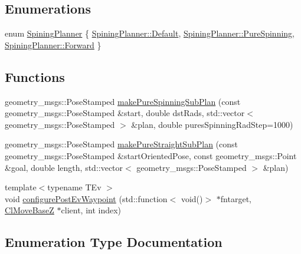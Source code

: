 \subsection*{Enumerations}
\begin{DoxyCompactItemize}
\item 
enum \hyperlink{namespacecl__move__base__z_aab2ad3041275145f0065fb60b3299345}{Spining\+Planner} \{ \hyperlink{namespacecl__move__base__z_aab2ad3041275145f0065fb60b3299345a7a1920d61156abc05a60135aefe8bc67}{Spining\+Planner\+::\+Default}, 
\hyperlink{namespacecl__move__base__z_aab2ad3041275145f0065fb60b3299345aada5274435681a4ce04175bebfa6652f}{Spining\+Planner\+::\+Pure\+Spinning}, 
\hyperlink{namespacecl__move__base__z_aab2ad3041275145f0065fb60b3299345a67d2f6740a8eaebf4d5c6f79be8da481}{Spining\+Planner\+::\+Forward}
 \}
\end{DoxyCompactItemize}
\subsection*{Functions}
\begin{DoxyCompactItemize}
\item 
geometry\+\_\+msgs\+::\+Pose\+Stamped \hyperlink{namespacecl__move__base__z_ac774e138510eb7b5e0015be1f7709e19}{make\+Pure\+Spinning\+Sub\+Plan} (const geometry\+\_\+msgs\+::\+Pose\+Stamped \&start, double dst\+Rads, std\+::vector$<$ geometry\+\_\+msgs\+::\+Pose\+Stamped $>$ \&plan, double pures\+Spinning\+Rad\+Step=1000)
\item 
geometry\+\_\+msgs\+::\+Pose\+Stamped \hyperlink{namespacecl__move__base__z_a84f0875e9e553c2795894cc9c21b2b3c}{make\+Pure\+Straight\+Sub\+Plan} (const geometry\+\_\+msgs\+::\+Pose\+Stamped \&start\+Oriented\+Pose, const geometry\+\_\+msgs\+::\+Point \&goal, double length, std\+::vector$<$ geometry\+\_\+msgs\+::\+Pose\+Stamped $>$ \&plan)
\item 
{\footnotesize template$<$typename T\+Ev $>$ }\\void \hyperlink{namespacecl__move__base__z_aee32c533c534df96361bb9622017e8e3}{configure\+Post\+Ev\+Waypoint} (std\+::function$<$ void()$>$ $\ast$fntarget, \hyperlink{classcl__move__base__z_1_1ClMoveBaseZ}{Cl\+Move\+BaseZ} $\ast$client, int index)
\end{DoxyCompactItemize}


\subsection{Enumeration Type Documentation}
\mbox{\label{namespacecl__move__base__z_aab2ad3041275145f0065fb60b3299345}} 
